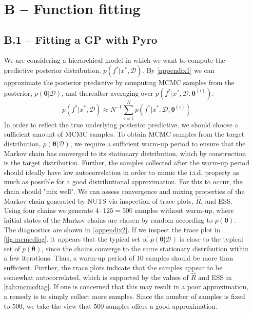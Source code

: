 \section*{B – Function fitting}

\subsection*{B.1 – Fitting a GP with Pyro}
We are considering a hierarchical model in which we want to compute the predictive posterior distribution, $p(f^*|x^*,\mathcal{D})$. By \autoref{appendix1} we can approximate the posterior predictive by computing MCMC samples from the posterior, $p(\bm{\theta}|\mathcal{D})$, and thereafter averaging over $p(f^*|x^*,\mathcal{D},\bm{\theta}^{(i)})$:
\begin{equation}
    p(f^*|x^*,\mathcal{D})\approx N^{-1}\sum_{i=1}^Np(f^*|x^*,\mathcal{D},\bm{\theta}^{(i)})
\end{equation}
In order to reflect the true underlying posterior predictive, we should choose a sufficient amount of MCMC samples. To obtain MCMC samples from the target distribution, $p(\bm{\theta}|\mathcal{D})$, we require a sufficient warm-up period to ensure that the Markov chain has converged to its stationary distribution, which by construction is the target distribution. Further, the samples collected after the warm-up period should ideally have low autocorrelation in order to mimic the i.i.d. property as much as possible for a good distributional approximation. For this to occur, the chain should "mix well". We can assess convergence and mixing properties of the Markov chain generated by NUTS via inspection of trace plots, $\hat{R}$, and ESS. Using four chains we generate $4\cdot125=500$ samples without warm-up, where initial states of the Markov chains are chosen by random according to $p(\bm{\theta})$. The diagnostics are shown in \autoref{appendix2}. If we inspect the trace plot in \autoref{fig:mcmcdiag}, it appears that the typical set of $p(\bm{\theta}|\mathcal{D})$ is close to the typical set of $p(\bm{\theta})$, since the chains converge to the same stationary distribution within a few iterations. Thus, a warm-up period of 10 samples should be more than sufficient. Further, the trace plots indicate that the samples appear to be somewhat autocorrelated, which is supported by the values of $\hat{R}$ and ESS in \autoref{tab:mcmcdiag}. If one is concerned that this may result in a poor approximation, a remedy is to simply collect more samples. Since the number of samples is fixed to 500, we take the view that 500 samples offers a good approximation.

